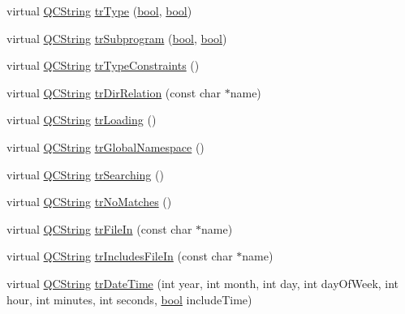 \begin{DoxyCompactItemize}
virtual \hyperlink{class_q_c_string}{Q\+C\+String} \hyperlink{class_translator_chinesetraditional_a9de6a1d81990aeaa3f8d908a51f2ad72}{tr\+Type} (\hyperlink{qglobal_8h_a1062901a7428fdd9c7f180f5e01ea056}{bool}, \hyperlink{qglobal_8h_a1062901a7428fdd9c7f180f5e01ea056}{bool})
\item 
virtual \hyperlink{class_q_c_string}{Q\+C\+String} \hyperlink{class_translator_chinesetraditional_ae442e7ae62789f601abb7d38c047631c}{tr\+Subprogram} (\hyperlink{qglobal_8h_a1062901a7428fdd9c7f180f5e01ea056}{bool}, \hyperlink{qglobal_8h_a1062901a7428fdd9c7f180f5e01ea056}{bool})
\item 
virtual \hyperlink{class_q_c_string}{Q\+C\+String} \hyperlink{class_translator_chinesetraditional_a5aae69c493e0af811754cbcb0e553a5d}{tr\+Type\+Constraints} ()
\item 
virtual \hyperlink{class_q_c_string}{Q\+C\+String} \hyperlink{class_translator_chinesetraditional_af3d98bcf16f0c032eae08846647e62e2}{tr\+Dir\+Relation} (const char $\ast$name)
\item 
virtual \hyperlink{class_q_c_string}{Q\+C\+String} \hyperlink{class_translator_chinesetraditional_a8bf00199efc9d136c2b3eb8e14f7db52}{tr\+Loading} ()
\item 
virtual \hyperlink{class_q_c_string}{Q\+C\+String} \hyperlink{class_translator_chinesetraditional_a1057c630dd7d991d9bffc0781b5edc7d}{tr\+Global\+Namespace} ()
\item 
virtual \hyperlink{class_q_c_string}{Q\+C\+String} \hyperlink{class_translator_chinesetraditional_a0b5925558367798e34bbf91af1a54ad8}{tr\+Searching} ()
\item 
virtual \hyperlink{class_q_c_string}{Q\+C\+String} \hyperlink{class_translator_chinesetraditional_a6df759ab56adf5043d7cb8bb4fd0d3eb}{tr\+No\+Matches} ()
\item 
virtual \hyperlink{class_q_c_string}{Q\+C\+String} \hyperlink{class_translator_chinesetraditional_a77a64b93b8ae15e492ce3481ebb54490}{tr\+File\+In} (const char $\ast$name)
\item 
virtual \hyperlink{class_q_c_string}{Q\+C\+String} \hyperlink{class_translator_chinesetraditional_ad41ba324119546456ffe0ef517513aa2}{tr\+Includes\+File\+In} (const char $\ast$name)
\item 
virtual \hyperlink{class_q_c_string}{Q\+C\+String} \hyperlink{class_translator_chinesetraditional_a8c32275e7278645b252fdf1a54dd4875}{tr\+Date\+Time} (int year, int month, int day, int day\+Of\+Week, int hour, int minutes, int seconds, \hyperlink{qglobal_8h_a1062901a7428fdd9c7f180f5e01ea056}{bool} include\+Time)

\end{DoxyCompactItemize}
